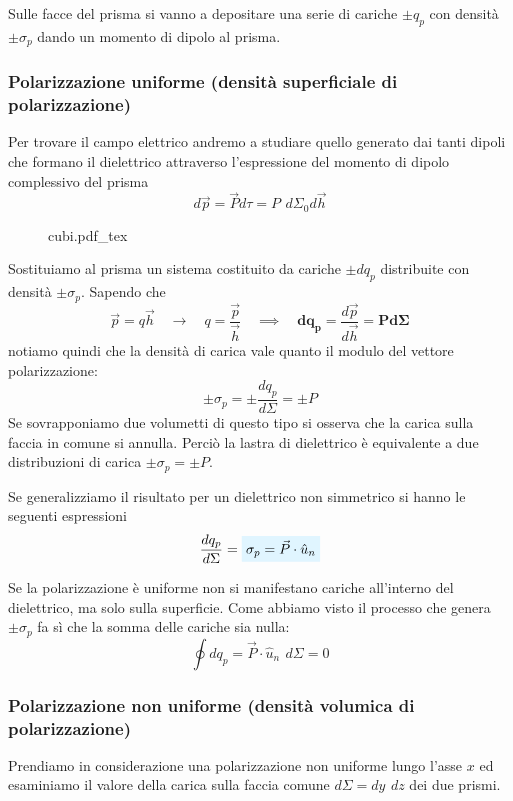 \documentclass[x11names]{report}
\newcommand{\incfig}[1]{%
	{#1.pdf_tex}
}
\newcommand{\viola}[1]{%
	\colorbox{myblue}{$\displaystyle #1$}
}
\begin{document}
Sulle facce del prisma si vanno a depositare una serie di cariche \(\pm q_p\) con densità \(\pm \sigma_p\) dando un momento di dipolo al prisma.

\subsubsection{Polarizzazione uniforme (densità superficiale di polarizzazione)}
Per trovare il campo elettrico andremo a studiare quello generato dai tanti dipoli che formano il dielettrico attraverso l'espressione del momento di dipolo complessivo del prisma
\[
d\vec{p} = \vec{P}d\tau = P \,\ d\Sigma_0 d\vec{h}
\]

\begin{figure}[H]
	\centering
	\incfig{cubi}
\end{figure}

Sostituiamo al prisma un sistema costituito da cariche \(\pm dq_p\) distribuite con densità \(\pm\sigma_p\). Sapendo che 
\[
\vec{p} = q \vec{h} \quad \to \quad q = \frac{\vec{p}}{\vec{h}} \quad \implies \quad \boldsymbol{dq_p =} \frac{d\vec{p}}{d\vec{h}} \boldsymbol{= Pd\Sigma}
\]
notiamo quindi che la densità di carica vale quanto il modulo del vettore polarizzazione:
\[
\pm\sigma_p = \pm\frac{dq_p}{d\Sigma} =\pm P
\]
Se sovrapponiamo due volumetti di questo tipo si osserva che la carica sulla faccia in comune si annulla. Perciò la lastra di dielettrico è equivalente a due distribuzioni di carica \(\pm \sigma_p = \pm P\).

Se generalizziamo il risultato per un dielettrico non simmetrico si hanno le seguenti espressioni 
\begin{equation}
	\frac{dq_p}{d\Sigma} = \viola{\sigma_p = \vec{P} \cdot \hat{u}_n  }
\end{equation}



Se la polarizzazione è uniforme non si manifestano cariche all'interno del dielettrico, ma solo sulla superficie. Come abbiamo visto il processo che genera \(\pm \sigma_p\) fa sì che la somma delle cariche sia nulla:
\[
\oint dq_p =  \vec{P} \cdot \hat{u}_n \,\ d\Sigma = 0
\]

\subsubsection{Polarizzazione non uniforme (densità volumica di polarizzazione)}
Prendiamo in considerazione una polarizzazione non uniforme lungo l'asse \(x\)  ed esaminiamo il valore della carica sulla faccia comune \(d\Sigma = dy \,\ dz \) dei due prismi.
\end{document}
